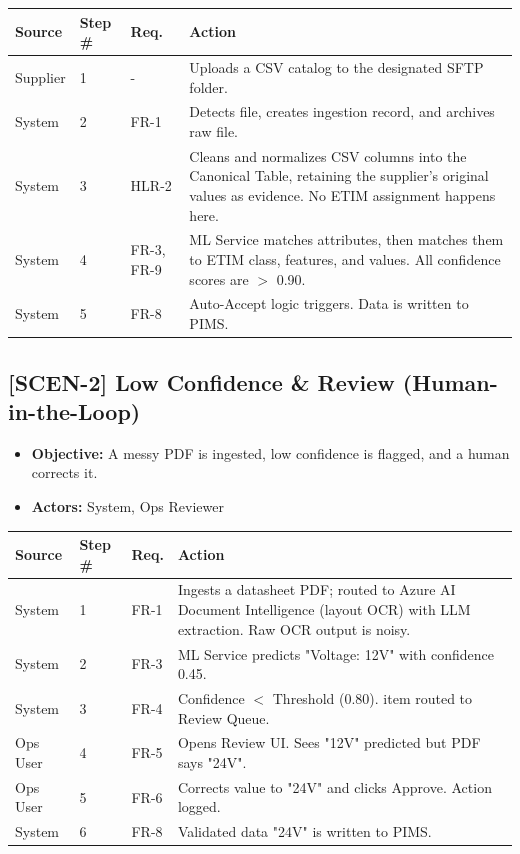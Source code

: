 \documentclass[12pt, a4paper]{article}
\begin{document}
\begin{longtable}{@{}llp{2cm}p{8cm}@{}}
\toprule
\textbf{Source} & \textbf{Step \#} & \textbf{Req.} & \textbf{Action} \\
\midrule
Supplier & 1 & - & Uploads a CSV catalog to the designated SFTP folder. \\
System & 2 & FR-1 & Detects file, creates ingestion record, and archives raw file. \\
System & 3 & HLR-2 & Cleans and normalizes CSV columns into the Canonical Table, retaining the supplier's original values as evidence. No ETIM assignment happens here. \\
System & 4 & FR-3, FR-9 & ML Service matches attributes, then matches them to ETIM class, features, and values. All confidence scores are $>$ 0.90. \\
System & 5 & FR-8 & Auto-Accept logic triggers. Data is written to PIMS. \\
\bottomrule
\end{longtable}

\subsection*{[SCEN-2] Low Confidence \& Review (Human-in-the-Loop)}
\begin{itemize}
    \item \textbf{Objective:} A messy PDF is ingested, low confidence is flagged, and a human corrects it.
    \item \textbf{Actors:} System, Ops Reviewer
\end{itemize}

\begin{longtable}{@{}llp{2cm}p{8cm}@{}}
\toprule
\textbf{Source} & \textbf{Step \#} & \textbf{Req.} & \textbf{Action} \\
\midrule
System & 1 & FR-1 & Ingests a datasheet PDF; routed to Azure AI Document Intelligence (layout OCR) with LLM extraction. Raw OCR output is noisy. \\
System & 2 & FR-3 & ML Service predicts "Voltage: 12V" with confidence 0.45. \\
System & 3 & FR-4 & Confidence $<$ Threshold (0.80). item routed to Review Queue. \\
Ops User & 4 & FR-5 & Opens Review UI. Sees "12V" predicted but PDF says "24V". \\
Ops User & 5 & FR-6 & Corrects value to "24V" and clicks Approve. Action logged. \\
System & 6 & FR-8 & Validated data "24V" is written to PIMS. \\
\bottomrule
\end{longtable}
\end{document}
